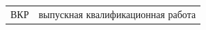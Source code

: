 
\noindent
\begin{tabular}{@{}l@{~—~}p{}@{}}
ВКР & выпускная квалификационная работа \\
\end{tabular}

